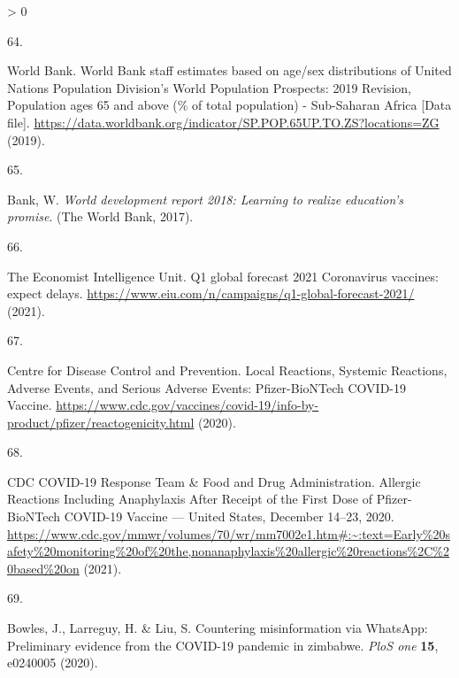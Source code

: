 \documentclass[
  12pt,
]{article}
\newlength{\cslhangindent}
\newlength{\csllabelwidth}
\newenvironment{CSLReferences}[2] %
 {%
  \setlength{\parindent}{0pt}
  \ifodd #1 \everypar{\setlength{\hangindent}{\cslhangindent}}\ignorespaces\fi
  \ifnum #2 > 0
  \setlength{\parskip}{#2\baselineskip}
  \fi
 }%
 {}
\newcommand{\CSLLeftMargin}[1]{\parbox[t]{\csllabelwidth}{#1}}
\newcommand{\CSLRightInline}[1]{\parbox[t]{\linewidth - \csllabelwidth}{#1}\break}
\begin{document}
\begin{CSLReferences}{0}{0}
\leavevmode\hypertarget{ref-WorldBanksubSahara}{}%
\CSLLeftMargin{64. }
\CSLRightInline{World Bank. {World Bank staff estimates based on age/sex distributions of United Nations Population Division's World Population Prospects: 2019 Revision, Population ages 65 and above (\% of total population) - Sub-Saharan Africa {[}Data file{]}}. \url{https://data.worldbank.org/indicator/SP.POP.65UP.TO.ZS?locations=ZG} (2019).}

\leavevmode\hypertarget{ref-world2017world}{}%
\CSLLeftMargin{65. }
\CSLRightInline{Bank, W. \emph{World development report 2018: Learning to realize education's promise}. (The World Bank, 2017).}

\leavevmode\hypertarget{ref-eiu}{}%
\CSLLeftMargin{66. }
\CSLRightInline{The Economist Intelligence Unit. {Q1 global forecast 2021 Coronavirus vaccines: expect delays}. \url{https://www.eiu.com/n/campaigns/q1-global-forecast-2021/} (2021).}

\leavevmode\hypertarget{ref-cdcadverse}{}%
\CSLLeftMargin{67. }
\CSLRightInline{Centre for Disease Control and Prevention. {Local Reactions, Systemic Reactions, Adverse Events, and Serious Adverse Events: Pfizer-BioNTech COVID-19 Vaccine}. \url{https://www.cdc.gov/vaccines/covid-19/info-by-product/pfizer/reactogenicity.html} (2020).}

\leavevmode\hypertarget{ref-cdcallergies}{}%
\CSLLeftMargin{68. }
\CSLRightInline{CDC COVID-19 Response Team \& Food and Drug Administration. {Allergic Reactions Including Anaphylaxis After Receipt of the First Dose of Pfizer-BioNTech COVID-19 Vaccine --- United States, December 14--23, 2020}. \url{https://www.cdc.gov/mmwr/volumes/70/wr/mm7002e1.htm\#:~:text=Early\%20safety\%20monitoring\%20of\%20the,nonanaphylaxis\%20allergic\%20reactions\%2C\%20based\%20on} (2021).}

\leavevmode\hypertarget{ref-bowles2020countering}{}%
\CSLLeftMargin{69. }
\CSLRightInline{Bowles, J., Larreguy, H. \& Liu, S. Countering misinformation via WhatsApp: Preliminary evidence from the COVID-19 pandemic in zimbabwe. \emph{PloS one} \textbf{15}, e0240005 (2020).}

\end{CSLReferences}

\newpage
\end{document}
